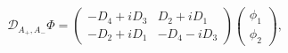 \begin{equation}
 \mathcal{D}_{A_+,A_-}\Phi=
  \begin{pmatrix} -D_4+iD_3 & D_2+iD_1\\
                  -D_2+iD_1 & -D_4-iD_3
  \end{pmatrix}
  \begin{pmatrix} \phi_1\\ \phi_2\end{pmatrix},
\end{equation} 
